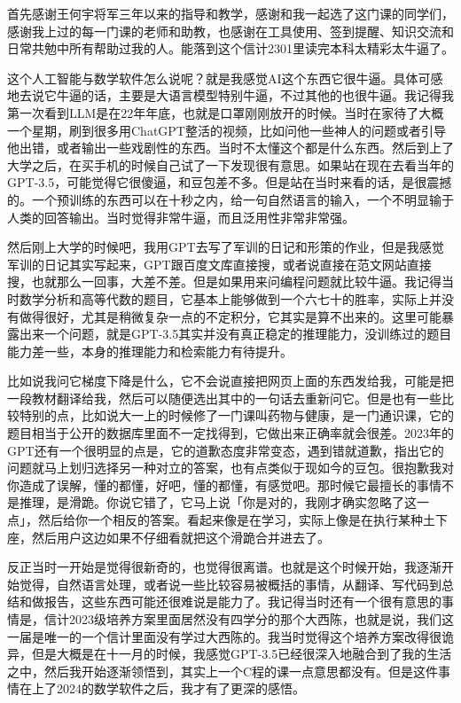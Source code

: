 首先感谢王何宇将军三年以来的指导和教学，感谢和我一起选了这门课的同学们，感谢我上过的每一门课的老师和助教，也感谢在工具使用、签到提醒、知识交流和日常共勉中所有帮助过我的人。能落到这个信计2301里读完本科太精彩太牛逼了。

这个人工智能与数学软件怎么说呢？就是我感觉AI这个东西它很牛逼。具体可感地去说它牛逼的话，主要是大语言模型特别牛逼，不过其他的也很牛逼。我记得我第一次看到LLM是在22年年底，也就是口罩刚刚放开的时候。当时在家待了大概一个星期，刷到很多用ChatGPT整活的视频，比如问他一些神人的问题或者引导他出错，或者输出一些戏剧性的东西。当时不太懂这个都是什么东西。然后到上了大学之后，在买手机的时候自己试了一下发现很有意思。如果站在现在去看当年的GPT-3.5，可能觉得它很傻逼，和豆包差不多。但是站在当时来看的话，是很震撼的。一个预训练的东西可以在十秒之内，给一句自然语言的输入，一个不明显输于人类的回答输出。当时觉得非常牛逼，而且泛用性非常非常强。

然后刚上大学的时候吧，我用GPT去写了军训的日记和形策的作业，但是我感觉军训的日记其实写起来，GPT跟百度文库直接搜，或者说直接在范文网站直接搜，也就那么一回事，大差不差。但是如果用来问编程问题就比较牛逼。我记得当时数学分析和高等代数的题目，它基本上能够做到一个六七十的胜率，实际上并没有做得很好，尤其是稍微复杂一点的不定积分，它其实是算不出来的。这里可能暴露出来一个问题，就是GPT-3.5其实并没有真正稳定的推理能力，没训练过的题目能力差一些，本身的推理能力和检索能力有待提升。

比如说我问它梯度下降是什么，它不会说直接把网页上面的东西发给我，可能是把一段教材翻译给我，然后可以随便选出其中的一句话去重新问它。但是也有一些比较特别的点，比如说大一上的时候修了一门课叫药物与健康，是一门通识课，它的题目相当于公开的数据库里面不一定找得到，它做出来正确率就会很差。2023年的GPT还有一个很明显的点是，它的道歉态度非常变态，遇到错就道歉，指出它的问题就马上划归选择另一种对立的答案，也有点类似于现如今的豆包。很抱歉我对你造成了误解，懂的都懂，好吧，懂的都懂，有感觉吧。那时候它最擅长的事情不是推理，是滑跪。你说它错了，它马上说「你是对的，我刚才确实忽略了这一点」，然后给你一个相反的答案。看起来像是在学习，实际上像是在执行某种土下座，然后用户这边如果不仔细看就把这个滑跪合并进去了。

反正当时一开始是觉得很新奇的，也觉得很离谱。也就是这个时候开始，我逐渐开始觉得，自然语言处理，或者说一些比较容易被概括的事情，从翻译、写代码到总结和做报告，这些东西可能还很难说是能力了。我记得当时还有一个很有意思的事情是，信计2023级培养方案里面居然没有四学分的那个大西陈，也就是说，我们这一届是唯一的一个信计里面没有学过大西陈的。我当时觉得这个培养方案改得很诡异，但是大概是在十一月的时候，我感觉GPT-3.5已经很深入地融合到了我的生活之中，然后我开始逐渐领悟到，其实上一个C程的课一点意思都没有。但是这件事情在上了2024的数学软件之后，我才有了更深的感悟。

